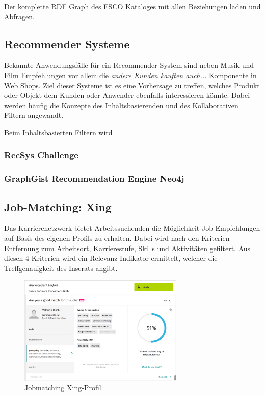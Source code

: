 Der komplette RDF Graph des ESCO Kataloges mit allen Beziehungen laden und Abfragen.


\subsection{Recommender Systeme}

Bekannte Anwendungsfälle für ein Recommender System sind neben Musik und Film Empfehlungen vor allem die \textit{andere Kunden kauften auch...} Komponente in Web Shops. Ziel dieser Systeme ist es eine Vorhersage zu treffen, welches Produkt oder Objekt dem Kunden oder Anwender ebenfalls interessieren könnte. Dabei werden häufig die Konzepte des Inhaltsbasierenden und des Kollaborativen Filtern angewandt. 

Beim Inhaltsbasierten Filtern wird 

\subsubsection{RecSys Challenge}
\subsubsection{GraphGist Recommendation Engine Neo4j}

\subsection{Job-Matching: Xing}

Das Karrierenetzwerk bietet Arbeitssuchenden die Möglichkeit Job-Empfehlungen auf Basis des eigenen Profils zu erhalten. Dabei wird nach den Kriterien Entfernung zum Arbeitsort, Karrierestufe, Skills und Aktivitäten gefiltert. Aus diesen 4 Kriterien wird ein Relevanz-Indikator ermittelt, welcher die Treffgenauigkeit des Inserats angibt. 

\begin{figure}[htb]
 \centering
 \includegraphics[width=0.7\textwidth,angle=0]{abb/xing_jobmatching}
 \caption[Beschreibung]{Jobmatching Xing-Profil}
\label{fig:Beschreibung}
\end{figure}

